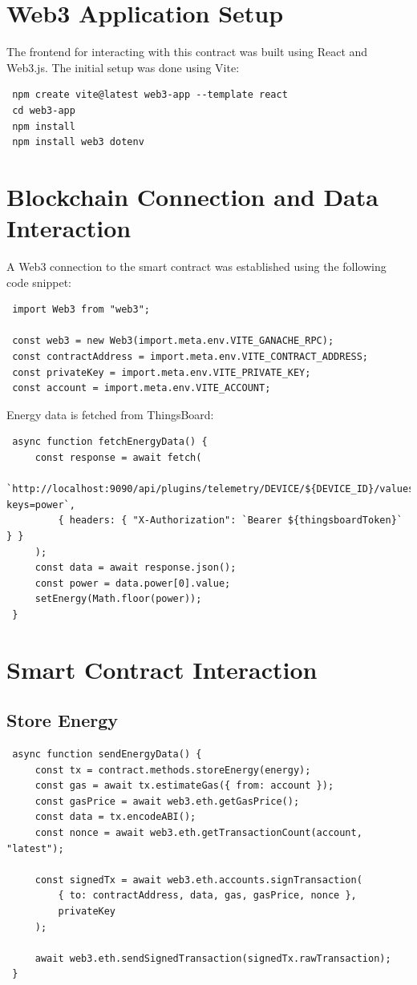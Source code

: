 \documentclass[a4paper,12pt]{report}
\begin{document}
 \section{Web3 Application Setup}
 The frontend for interacting with this contract was built using React and Web3.js. The initial setup was done using Vite:
 
 \begin{lstlisting}
 npm create vite@latest web3-app --template react
 cd web3-app
 npm install
 npm install web3 dotenv
 \end{lstlisting}
 
 \section{Blockchain Connection and Data Interaction}
 A Web3 connection to the smart contract was established using the following code snippet:
 
 \begin{lstlisting}
 import Web3 from "web3";
 
 const web3 = new Web3(import.meta.env.VITE_GANACHE_RPC);
 const contractAddress = import.meta.env.VITE_CONTRACT_ADDRESS;
 const privateKey = import.meta.env.VITE_PRIVATE_KEY;
 const account = import.meta.env.VITE_ACCOUNT;
 \end{lstlisting}
 
 Energy data is fetched from ThingsBoard:
 
 \begin{lstlisting}
 async function fetchEnergyData() {
     const response = await fetch(
         `http://localhost:9090/api/plugins/telemetry/DEVICE/${DEVICE_ID}/values/timeseries?keys=power`,
         { headers: { "X-Authorization": `Bearer ${thingsboardToken}` } }
     );
     const data = await response.json();
     const power = data.power[0].value;
     setEnergy(Math.floor(power));
 }
 \end{lstlisting}
 
 \section{Smart Contract Interaction}
 
 \subsection{Store Energy}
 \begin{lstlisting}
 async function sendEnergyData() {
     const tx = contract.methods.storeEnergy(energy);
     const gas = await tx.estimateGas({ from: account });
     const gasPrice = await web3.eth.getGasPrice();
     const data = tx.encodeABI();
     const nonce = await web3.eth.getTransactionCount(account, "latest");
 
     const signedTx = await web3.eth.accounts.signTransaction(
         { to: contractAddress, data, gas, gasPrice, nonce },
         privateKey
     );
 
     await web3.eth.sendSignedTransaction(signedTx.rawTransaction);
 }
 \end{lstlisting}
 
\end{document}

